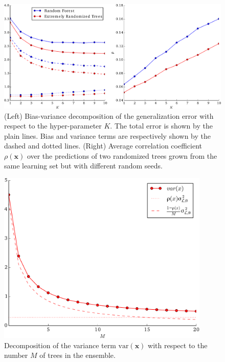 \begin{figure}
    \centering
    \includegraphics[width=\textwidth]{figures/ch4_correlation.pdf}
    \caption{(Left) Bias-variance decomposition of the generalization error
            with respect to the hyper-parameter $K$. The total error is shown by the plain
            lines. Bias and variance terms are respectively shown by the dashed and dotted
            lines.  (Right) Average correlation
            coefficient $\rho(\mathbf{x})$ over the predictions of two randomized trees
            grown from the same learning set but with different random seeds.}
    \label{fig:correlation}
\end{figure}
\begin{figure}
    \centering
    \includegraphics[width=0.9\textwidth]{figures/ch4_variance.pdf}
    \caption{Decomposition of the variance term $\text{var}(\mathbf{x})$ with respect to the number $M$ of trees in the ensemble.}
    \label{fig:variance}
\end{figure}

